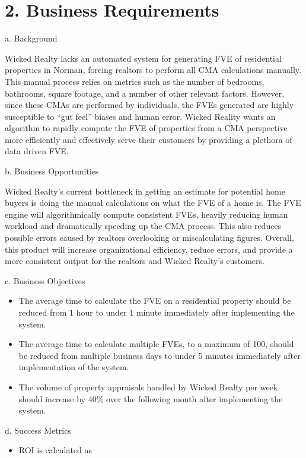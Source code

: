 \documentclass[
]{article}
\begin{document}
\hypertarget{business-requirements}{%
\section{2. Business Requirements}\label{business-requirements}}

a. Background

Wicked Realty lacks an automated system for generating FVE of
residential properties in Norman, forcing realtors to perform all CMA
calculations manually. This manual process relies on metrics such as the
number of bedrooms, bathrooms, square footage, and a number of other
relevant factors. However, since these CMAs are performed by
individuals, the FVEs generated are highly susceptible to ``gut feel''
biases and human error. Wicked Reality wants an algorithm to rapidly
compute the FVE of properties from a CMA perspective more efficiently
and effectively serve their customers by providing a plethora of data
driven FVE.

b. Business Opportunities

Wicked Realty's current bottleneck in getting an estimate for potential
home buyers is doing the manual calculations on what the FVE of a home
is. The FVE engine will algorithmically compute consistent FVEs, heavily
reducing human workload and dramatically speeding up the CMA process.
This also reduces possible errors caused by realtors overlooking or
miscalculating figures. Overall, this product will increase
organizational efficiency, reduce errors, and provide a more consistent
output for the realtors and Wicked Realty's customers.

c. Business Objectives

\begin{itemize}
\item
  The average time to calculate the FVE on a residential property should
  be reduced from 1 hour to under 1 minute immediately after
  implementing the system.
\item
  The average time to calculate multiple FVEs, to a maximum of 100,
  should be reduced from multiple business days to under 5 minutes
  immediately after implementation of the system.
\item
  The volume of property appraisals handled by Wicked Realty per week
  should increase by 40\% over the following month after implementing
  the system.
\end{itemize}

d. Success Metrics

\begin{itemize}
\item
  ROI is calculated as
\end{itemize}
\end{document}
